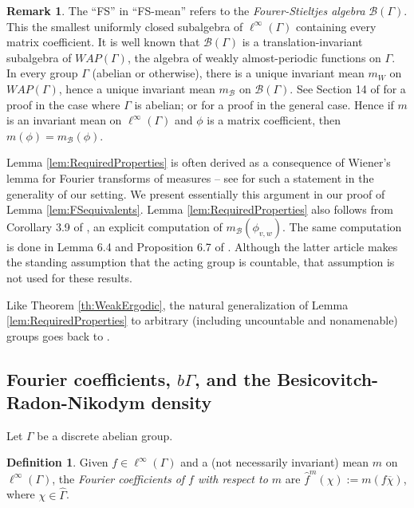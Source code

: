 \documentclass[12pt]{amsart} \usepackage{amsmath,centernot,amssymb,leftindex}
\numberwithin{theorem}{section}
\numberwithin{equation}{section}
\theoremstyle{definition}
\newtheorem{definition}[theorem]{Definition}
\newtheorem{remark}[theorem]{Remark}
\begin{document}
\begin{remark} The ``FS'' in ``FS-mean'' refers to the \emph{Fourer-Stieltjes algebra} $\mathcal B(\Gamma)$.  This the smallest uniformly closed subalgebra of $\ell^{\infty}(\Gamma)$ containing every matrix coefficient.  It is well known that $\mathcal B(\Gamma)$ is a translation-invariant subalgebra of $WAP(\Gamma)$, the algebra of weakly almost-periodic functions on $\Gamma$.  In every group $\Gamma$ (abelian or otherwise), there is a unique invariant mean $m_{W}$ on $WAP(\Gamma)$, hence a unique invariant mean $m_{\mathcal B}$ on $\mathcal B(\Gamma)$.  See Section 14 of \cite{Eberlein_AbstractErgodic} for a proof in the case where $\Gamma$ is abelian;  \cite[Corollary 1.26]{Burckel_WAP_book} or \cite[Theorem 1.20]{Burckel_WAP_Thesis}  for a proof in the general case.  Hence if $m$ is an invariant mean on $\ell^\infty(\Gamma)$ and $\phi$ is a matrix coefficient, then $m(\phi)=m_{\mathcal B}(\phi)$.
\end{remark}

Lemma \ref{lem:RequiredProperties} is often derived as a consequence of Wiener's lemma for Fourier transforms of measures -- see \cite{Eberlein_FS} for such a statement in the generality of our setting. We present essentially this argument in our proof of Lemma \ref{lem:FSequivalents}.  Lemma \ref{lem:RequiredProperties} also follows from  Corollary 3.9 of \cite{Badea_Grivaux_KazhdanED}, an explicit computation of $m_{\mathcal B}(\phi_{v,w})$. The same computation is done in Lemma 6.4 and Proposition 6.7 of \cite{BjorklundFish_ProductSet}.  Although the latter article makes the standing assumption that the acting group is countable, that assumption is not used for these results.  

Like Theorem \ref{th:WeakErgodic}, the natural generalization of Lemma \ref{lem:RequiredProperties} to arbitrary (including uncountable and nonamenable) groups goes back to \cite{Godement}.









\subsection{Fourier coefficients, \texorpdfstring{$b\Gamma$}{bGamma}, and the Besicovitch-Radon-Nikodym density}

Let $\Gamma$ be a discrete abelian group.

	\begin{definition}\label{def:meanFourierCoefficients} Given $f\in \ell^\infty(\Gamma)$ and a (not necessarily invariant) mean $m$ on $\ell^\infty(\Gamma)$, the \emph{Fourier coefficients of $f$ with respect to $m$} are $\hat{f}^m(\chi):=m(f\overline{\chi})$, where $\chi\in\widehat{\Gamma}$.  
\end{definition}
\end{document}
